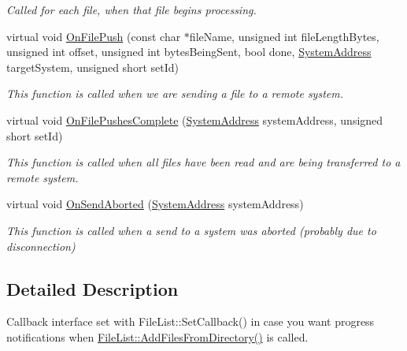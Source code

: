 \begin{DoxyCompactItemize}
\begin{DoxyCompactList}\small\item\em Called for each file, when that file begins processing. \end{DoxyCompactList}\item 
virtual void \hyperlink{class_rak_net_1_1_file_list_progress_a095e3b79e163c22c0b1ccc7e1e71c8b9}{On\-File\-Push} (const char $\ast$file\-Name, unsigned int file\-Length\-Bytes, unsigned int offset, unsigned int bytes\-Being\-Sent, bool done, \hyperlink{struct_rak_net_1_1_system_address}{System\-Address} target\-System, unsigned short set\-Id)
\begin{DoxyCompactList}\small\item\em This function is called when we are sending a file to a remote system. \end{DoxyCompactList}\item 
\hypertarget{class_rak_net_1_1_file_list_progress_ac4856959e3d72933a287e5736935afc4}{virtual void \hyperlink{class_rak_net_1_1_file_list_progress_ac4856959e3d72933a287e5736935afc4}{On\-File\-Pushes\-Complete} (\hyperlink{struct_rak_net_1_1_system_address}{System\-Address} system\-Address, unsigned short set\-Id)}\label{class_rak_net_1_1_file_list_progress_ac4856959e3d72933a287e5736935afc4}

\begin{DoxyCompactList}\small\item\em This function is called when all files have been read and are being transferred to a remote system. \end{DoxyCompactList}\item 
\hypertarget{class_rak_net_1_1_file_list_progress_a496ab33afd5f48473d42b8095095a908}{virtual void \hyperlink{class_rak_net_1_1_file_list_progress_a496ab33afd5f48473d42b8095095a908}{On\-Send\-Aborted} (\hyperlink{struct_rak_net_1_1_system_address}{System\-Address} system\-Address)}\label{class_rak_net_1_1_file_list_progress_a496ab33afd5f48473d42b8095095a908}

\begin{DoxyCompactList}\small\item\em This function is called when a send to a system was aborted (probably due to disconnection) \end{DoxyCompactList}\end{DoxyCompactItemize}


\subsection{Detailed Description}
Callback interface set with File\-List\-::\-Set\-Callback() in case you want progress notifications when \hyperlink{class_rak_net_1_1_file_list_a9ff81c1d5fb8ad1897fd6b6b12108cf8}{File\-List\-::\-Add\-Files\-From\-Directory()} is called. 

